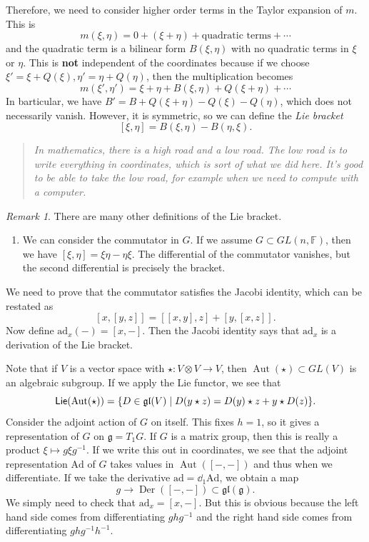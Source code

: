 \documentclass[leqno, openany]{memoir}
\theoremstyle{definition}
\theoremstyle{remark}
\newtheorem{rmk}[thm]{Remark}
\theoremstyle{plain}
\theoremstyle{definition}
\theoremstyle{remark}
\newcommand{\F}{\mathbb{F}}
\newcommand{\mf}[1]{\mathfrak{#1}}
\newcommand{\mr}[1]{\mathrm{#1}}
\DeclareMathOperator{\Der}{Der}
\DeclareMathOperator{\Aut}{Aut}
\DeclareMathOperator{\Lie}{\mathsf{Lie}}
\begin{document}
Therefore, we need to consider higher order terms in the Taylor expansion of $m$. This is
\[ m(\xi, \eta) = 0 + (\xi + \eta) + \text{quadratic terms} + \cdots \]
and the quadratic term is a bilinear form $B(\xi, \eta)$ with no quadratic terms in $\xi$ or $\eta$. This is \textbf{not} independent of the coordinates because if we choose $\xi' = \xi + Q(\xi), \eta' = \eta + Q(\eta)$, then the multiplication becomes
\[ m(\xi', \eta') = \xi + \eta + B(\xi, \eta) + Q(\xi + \eta) + \cdots \]
In barticular, we have $B' = B + Q(\xi + \eta) - Q(\xi) - Q(\eta)$, which does not necessarily vanish. However, it is symmetric, so we can define the \textit{Lie bracket} 
\[ [\xi, \eta] = B(\xi, \eta) - B(\eta, \xi). \]

\begin{quotation}
    \itshape In mathematics, there is a high road and a low road. The low road is to write everything in coordinates, which is sort of what we did here. It's good to be able to take the low road, for example when we need to compute with a computer. 
\end{quotation}

\begin{rmk}
    There are many other definitions of the Lie bracket. 
    \begin{enumerate}
        \item We can consider the commutator in $G$. If we assume $G \subset GL(n, \F)$, then we have $[\xi, \eta] = \xi \eta - \eta \xi$. The differential of the commutator vanishes, but the second differential is precisely the bracket.
    \end{enumerate}
\end{rmk}

We need to prove that the commutator satisfies the Jacobi identity, which can be restated as
\[ [x, [y,z]] = [[x,y],z] + [y, [x,z]]. \]
Now define $\mr{ad}_x(-) = [x,-]$. Then the Jacobi identity says that $\mr{ad}_x$ is a derivation of the Lie bracket.

Note that if $V$ is a vector space with $\star \colon V \otimes V \to V$, then $\Aut(\star) \subset GL(V)$ is an algebraic subgroup. If we apply the Lie functor, we see that
\[ \Lie ( \Aut(\star) ) = \qty{ D \in \mf{gl}(V) \mid D(y \star z) = D(y) \star z + y \star D(z) }. \]
Consider the adjoint action of $G$ on itself. This fixes $h = 1$, so it gives a representation of $G$ on $\mf{g} = T_1 G$. If $G$ is a matrix group, then this is really a product $\xi \mapsto g \xi g^{-1}$. If we write this out in coordinates, we see that the adjoint representation $\mr{Ad}$ of $G$ takes values in $\Aut([-,-])$ and thus when we differentiate. If we take the derivative $\mr{ad} = \dd_1 \mr{Ad}$, we obtain a map
\[ g \to \Der([-,-]) \subset \mf{gl}(\mf{g}). \]
We simply need to check that $\mr{ad}_x = [x,-]$. But this is obvious because the left hand side comes from differentiating $ghg^{-1}$ and the right hand side comes from differentiating $ghg^{-1}h^{-1}$.
\end{document}
